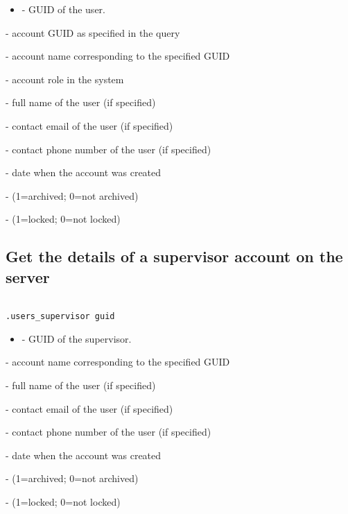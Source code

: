 \paramsheader
\begin{itemize}
    \item {} - GUID of the user.
\end{itemize}

\savedres
\begin{compactitem}
    \item {} - account GUID as specified in the query
    \item {} - account name corresponding to the specified GUID
    \item {} - account role in the system
    \item {} - full name of the user (if specified)
    \item {} - contact email of the user (if specified)
    \item {} - contact phone number of the user (if specified)
    \item {} - date when the account was created
    \item {} - (1=archived; 0=not archived)
    \item {} - (1=locked; 0=not locked)
\end{compactitem}

\subsection{Get the details of a supervisor account on the server}
\begin{lstlisting}[style=CommandLineStyle, showlines=true]

.users_supervisor guid

\end{lstlisting}

\paramsheader
\begin{itemize}
\item {} - GUID of the supervisor.
\end{itemize}

\savedres
\begin{compactitem}
    \item {} - account name corresponding to the specified GUID
    \item {} - full name of the user (if specified)
    \item {} - contact email of the user (if specified)
    \item {} - contact phone number of the user (if specified)
    \item {} - date when the account was created
    \item {} - (1=archived; 0=not archived)
    \item {} - (1=locked; 0=not locked)
\end{compactitem}


